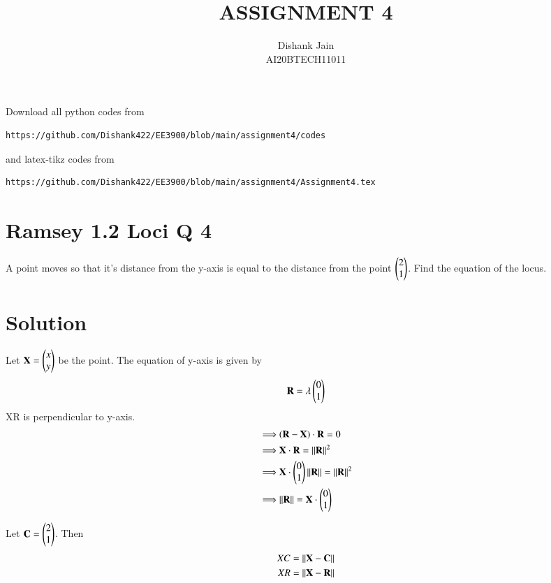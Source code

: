 \documentclass[journal,12pt,twocolumn]{IEEEtran}
\begin{document}
     \def\centbox#1{\makebox[0in]{#1}}
     \def\topbox#1{\raisebox{-\baselineskip}[0in][0in]{#1}}
     \def\midbox#1{\raisebox{-0.5\baselineskip}[0in][0in]{#1}}
\vspace{3cm}
\title{ASSIGNMENT 4}
\author{Dishank Jain \\ AI20BTECH11011}
\maketitle
\newpage
\bigskip
\renewcommand{\thefigure}{\theenumi}
\renewcommand{\thetable}{\theenumi}
Download all python codes from
%
\begin{lstlisting}
https://github.com/Dishank422/EE3900/blob/main/assignment4/codes
\end{lstlisting}
% 
and latex-tikz codes from 
%
\begin{lstlisting}
https://github.com/Dishank422/EE3900/blob/main/assignment4/Assignment4.tex
\end{lstlisting}
%
\section{Ramsey 1.2 Loci Q 4}
A point moves so that it's distance from the y-axis is equal to the distance from the point $\begin{pmatrix}2\\1\end{pmatrix}$. Find the equation of the locus. 

\section{Solution}
Let $\mathbf{X} = \begin{pmatrix}x\\y\end{pmatrix}$ be the point. The equation of y-axis is given by
\begin{equation}
    \mathbf{R} = \lambda \begin{pmatrix}0\\1\end{pmatrix}
\end{equation}
XR is perpendicular to y-axis.
\begin{align}
    \implies &(\mathbf{R} - \mathbf{X})\cdot \mathbf{R} = 0\\
    \implies &\mathbf{X}\cdot \mathbf{R} = \lVert\mathbf{R}\rVert^2\label{RelXR}\\
    \implies &\mathbf{X}\cdot \begin{pmatrix}0\\1\end{pmatrix}\lVert\mathbf{R}\rVert = \lVert\mathbf{R}\rVert^2\\
    \implies &\lVert\mathbf{R}\rVert = \mathbf{X}\cdot \begin{pmatrix}0\\1\end{pmatrix}
\end{align}

Let $\mathbf{C} = \begin{pmatrix}2\\1\end{pmatrix}$. Then
\begin{align}
     XC &= \lVert\mathbf{X} - \mathbf{C}\rVert\\
     XR &= \lVert\mathbf{X} - \mathbf{R}\rVert
\end{align}
\end{document}
